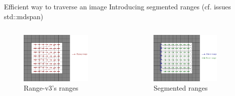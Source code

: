\documentclass[12pt,aspectratio=169]{beamer}
\begin{document}
\begin{frame}[fragile]{Efficient way to traverse an image}
  Introducing segmented ranges (cf. issues std::mdspan)
  \begin{columns}[T,onlytextwidth]
    \begin{figure}
      \includegraphics[width=0.8\textwidth]{../figures/linear_rng}
      \caption{Range-v3's ranges}
    \end{figure}

    \begin{figure}
      \includegraphics[width=0.8\textwidth]{../figures/segmented_rng}
      \caption{Segmented ranges}
    \end{figure}
  \end{columns}
\end{frame}
\end{document}
